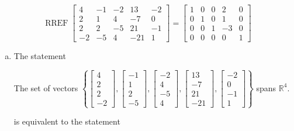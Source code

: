 \begin{exerciseAnswer} 


\[\operatorname{RREF} \left[\begin{array}{ccccc}
4 & -1 & -2 & 13 & -2 \\
2 & 1 & 4 & -7 & 0 \\
2 & 2 & -5 & 21 & -1 \\
-2 & -5 & 4 & -21 & 1
\end{array}\right] = \left[\begin{array}{ccccc}
1 & 0 & 0 & 2 & 0 \\
0 & 1 & 0 & 1 & 0 \\
0 & 0 & 1 & -3 & 0 \\
0 & 0 & 0 & 0 & 1
\end{array}\right] \]


\begin{enumerate}[(a)]
\item The statement 
\begin{center}\begin{minipage}{0.8\textwidth}
 The set of vectors \( \left\{ \left[\begin{array}{c}
4 \\
2 \\
2 \\
-2
\end{array}\right] , \left[\begin{array}{c}
-1 \\
1 \\
2 \\
-5
\end{array}\right] , \left[\begin{array}{c}
-2 \\
4 \\
-5 \\
4
\end{array}\right] , \left[\begin{array}{c}
13 \\
-7 \\
21 \\
-21
\end{array}\right] , \left[\begin{array}{c}
-2 \\
0 \\
-1 \\
1
\end{array}\right] \right\} \) spans \(\mathbb{R}^4\). 
\end{minipage}\end{center}
     is equivalent to the statement 

\end{enumerate}
\end{exerciseAnswer}
